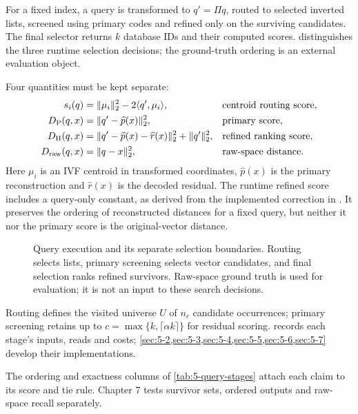 For a fixed index, a query is transformed to $q'=\Pi q$, routed to
selected inverted lists, screened using primary codes and refined only
on the surviving candidates. The final selector returns $k$ database
IDs and their computed scores.  distinguishes the
three runtime selection decisions; the ground-truth ordering is an
external evaluation object.

Four quantities must be kept separate:
\begin{align}
 s_i(q)&=\|\mu_i\|_2^2-2\langle q',\mu_i\rangle,
                   &&\text{centroid routing score},\nonumber\\
 D_{\mathrm{P}}(q,x)&=\|q'-\widehat p(x)\|_2^2,
                   &&\text{primary score},\nonumber\\
 D_{\mathrm{H}}(q,x)&=\|q'-\widehat p(x)-\widehat r(x)\|_2^2
                       +\|q'\|_2^2,
                   &&\text{refined ranking score},\nonumber\\
 D_{\mathrm{raw}}(q,x)&=\|q-x\|_2^2,
                   &&\text{raw-space distance}.
 \label{eq:5-ranking-objects}
\end{align}
Here $\mu_i$ is an IVF centroid in transformed coordinates,
$\widehat p(x)$ is the primary reconstruction and $\widehat r(x)$ is
the decoded residual. The runtime refined score includes a query-only
constant, as derived from the implemented correction in .
It preserves the ordering of reconstructed distances for a fixed query,
but neither it nor the primary score is the original-vector distance.

\begin{figure}[tbp]
\centering

\caption[Query stages and selection boundaries]{Query execution and its separate selection boundaries. Routing
selects lists, primary screening selects vector candidates, and final
selection ranks refined survivors. Raw-space ground truth is used for
evaluation; it is not an input to these search decisions.}
\label{fig:5-query-path}
\end{figure}

Routing defines the visited universe $U$ of $n_c$ candidate occurrences;
primary screening retains up to $c=\max\{k,\lceil\alpha k\rceil\}$ for
residual scoring.  records each stage's inputs,
reads and costs; \cref{sec:5-2,sec:5-3,sec:5-4,sec:5-5,sec:5-6,sec:5-7}
develop their implementations.

The ordering and exactness columns of \cref{tab:5-query-stages}
attach each claim to its score and tie rule. Chapter 7 tests survivor
sets, ordered outputs and raw-space recall separately.



